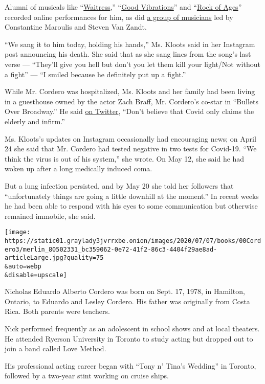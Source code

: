 Alumni of musicals like
``\href{https://youtu.be/RIkV4s3ubj8}{Waitress},''
``\href{https://www.instagram.com/tv/B_gkSkHngdb/?igshid=12rkjeumeagpk}{Good
Vibrations}'' and
``\href{https://www.facebookcorewwwi.onion/jonquesenberry/videos/10160469098802524/?t=2}{Rock
of Ages}'' recorded online performances for him, as did
\href{https://youtu.be/-mVKcSmaHbI}{a group of musicians} led by
Constantine Maroulis and Steven Van Zandt.

``We sang it to him today, holding his hands,'' Ms. Kloots said in her
Instagram post announcing his death. She said that as she sang lines
from the song's last verse --- ``They'll give you hell but don't you let
them kill your light/Not without a fight'' --- ``I smiled because he
definitely put up a fight.''

While Mr. Cordero was hospitalized, Ms. Kloots and her family had been
living in a guesthouse owned by the actor Zach Braff, Mr. Cordero's
co-star in ``Bullets Over Broadway.'' He said
\href{https://twitter.com/zachbraff/status/1279961237342674944}{on
Twitter}, ``Don't believe that Covid only claims the elderly and
infirm.''

Ms. Kloots's updates on Instagram occasionally had encouraging news; on
April 24 she said that Mr. Cordero had tested negative in two tests for
Covid-19. ``We think the virus is out of his system,'' she wrote. On May
12, she said he had woken up after a long medically induced coma.

But a lung infection persisted, and by May 20 she told her followers
that ``unfortunately things are going a little downhill at the moment.''
In recent weeks he had been able to respond with his eyes to some
communication but otherwise remained immobile, she said.

\texttt{[image: https://static01.graylady3jvrrxbe.onion/images/2020/07/07/books/00Cordero3/merlin\_80502331\_bc359062-0e72-41f2-86c3-4404f29ae8ad-articleLarge.jpg?quality=75\\\&auto=webp\\\&disable=upscale]}

Nicholas Eduardo Alberto Cordero was born on Sept. 17, 1978, in
Hamilton, Ontario, to Eduardo and Lesley Cordero. His father was
originally from Costa Rica. Both parents were teachers.

Nick performed frequently as an adolescent in school shows and at local
theaters. He attended Ryerson University in Toronto to study acting but
dropped out to join a band called Love Method.

His professional acting career began with ``Tony n' Tina's Wedding'' in
Toronto, followed by a two-year stint working on cruise ships.

